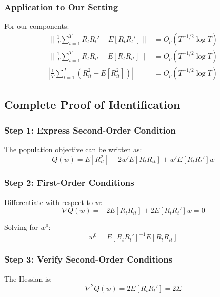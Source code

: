 \documentclass[12pt,article]{memoir}
\begin{document}
\subsubsection{Application to Our Setting}

For our components:
\begin{align}
    \|\frac{1}{T}\sum_{t=1}^T R_{t}R_{t}' - E[R_{t}R_{t}']\| &= O_p(T^{-1/2}\log T) \\
    \|\frac{1}{T}\sum_{t=1}^T R_{t}R_{it} - E[R_{t}R_{it}]\| &= O_p(T^{-1/2}\log T) \\
    |\frac{1}{T}\sum_{t=1}^T (R_{it}^2 - E[R_{it}^2])| &= O_p(T^{-1/2}\log T)
\end{align}

\subsection{Complete Proof of Identification}

\subsubsection{Step 1: Express Second-Order Condition}

The population objective can be written as:
\begin{equation}
    Q(w) = E[R_{it}^2] - 2w'E[R_{t}R_{it}] + w'E[R_{t}R_{t}']w
\end{equation}

\subsubsection{Step 2: First-Order Conditions}

Differentiate with respect to $w$:
\begin{equation}
    \nabla Q(w) = -2E[R_{t}R_{it}] + 2E[R_{t}R_{t}']w = 0
\end{equation}

Solving for $w^0$:
\begin{equation}
    w^0 = E[R_{t}R_{t}']^{-1}E[R_{t}R_{it}]
\end{equation}

\subsubsection{Step 3: Verify Second-Order Conditions}

The Hessian is:
\begin{equation}
    \nabla^2 Q(w) = 2E[R_{t}R_{t}'] = 2\Sigma
\end{equation}
\end{document}
